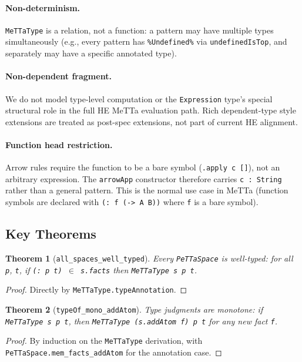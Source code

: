 \documentclass[]{article}
\newtheorem{theorem}{Theorem}
\newcommand{\code}[1]{\texttt{#1}}
\newcommand{\MeTTa}{\textup{MeTTa}}
\begin{document}
\paragraph{Non-determinism.}  \code{MeTTaType} is a relation, not a function:
a pattern may have multiple types simultaneously (e.g., every pattern has
\code{\%Undefined\%} via \code{undefinedIsTop}, and separately may have a
specific annotated type).

\paragraph{Non-dependent fragment.}  We do not model type-level computation or
the \code{Expression} type's special structural role in the full HE
\MeTTa{} evaluation path.  Rich dependent-type style extensions are treated as
post-spec extensions, not part of current HE alignment.

\paragraph{Function head restriction.}  Arrow rules require the function to be
a bare symbol (\code{.apply c []}), not an arbitrary expression.  The
\code{arrowApp} constructor therefore carries \code{c : String} rather than a
general pattern.  This is the normal use case in MeTTa (function symbols are
declared with \code{(: f (-> A B))} where \code{f} is a bare symbol).

\subsection{Key Theorems}

\begin{theorem}[\code{all\_spaces\_well\_typed}]
Every \code{PeTTaSpace} is well-typed: for all \code{p}, \code{t},
if \code{(: p t) $\in$ s.facts} then \code{MeTTaType s p t}.
\end{theorem}

\begin{proof}
Directly by \code{MeTTaType.typeAnnotation}.
\end{proof}

\begin{theorem}[\code{typeOf\_mono\_addAtom}]
Type judgments are monotone: if \code{MeTTaType s p t}, then
\code{MeTTaType (s.addAtom f) p t} for any new fact \code{f}.
\end{theorem}

\begin{proof}
By induction on the \code{MeTTaType} derivation, with
\code{PeTTaSpace.mem\_facts\_addAtom} for the annotation case.
\end{proof}
\end{document}
